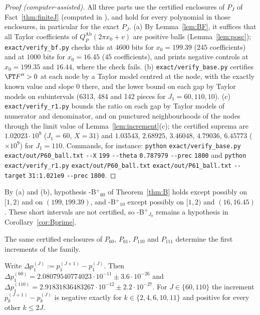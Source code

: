 \begin{proof}[Proof (computer-assisted)]
All three parts use the certified enclosures of $P_J$ of Fact~\ref{thm:finiteJ} (computed in \cite{PaperI}), and hold for
every polynomial in those enclosures, in particular for the exact $P_J$. (a) By Lemma~\ref{lem:BF}, it suffices that all
Taylor coefficients of $Q^{\mathrm{Ab}}_P(2\pi x_0+v)$ are positive balls (Lemma~\ref{lem:posc}); \nolinkurl{exact/verify_bf.py}
checks this at $4600$ bits for $x_0=199.39$ ($245$ coefficients) and at $1000$ bits for $x_0=16.45$ ($45$ coefficients),
and prints negative controls at $x_0=199.35$ and $16.44$, where the check fails. (b) \nolinkurl{exact/verify_base.py}
certifies $\FT F''>0$ at each node by a Taylor model centred at the node, with the exactly known value and slope $0$
there, and the lower bound on each gap by Taylor models on subintervals (6313, 484 and 142 pieces for $J_1=60,110,10$).
(c) \nolinkurl{exact/verify_r1.py} bounds the ratio on each gap by Taylor models of numerator and denominator, and on
punctured neighbourhoods of the nodes through the limit value of Lemma~\ref{lem:increment}(c); the certified suprema are
$1.02023\cdot10^9$ ($J_1=60$, $X=31$) and $1.03543$, $2.68925$, $3.46048$, $4.79036$, $6.45773$ ($\times10^9$) for
$J_1=110$. Commands, for instance:
\texttt{python} \nolinkurl{exact/verify_base.py} \nolinkurl{exact/out/P60_ball.txt} \nolinkurl{--X} \nolinkurl{199} \nolinkurl{--theta} \nolinkurl{0.787979} \nolinkurl{--prec} \nolinkurl{1800} and
\texttt{python} \nolinkurl{exact/verify_r1.py} \nolinkurl{exact/out/P60_ball.txt} \nolinkurl{exact/out/P61_ball.txt} \nolinkurl{--target} \nolinkurl{31:1.021e9} \nolinkurl{--prec} \nolinkurl{1800}.
\end{proof}

By (a) and (b), hypothesis \hyp{B$^+$}$_{60}$ of Theorem~\ref{thm:B} holds except possibly on $[1,2)$ and on
$(199,199.39)$, and \hyp{B$^+$}$_{10}$ except possibly on $[1,2)$ and $(16,16.45)$. These short intervals are not certified,
so \hyp{B$^+$}$_{J_0}$ remains a hypothesis in Corollary~\ref{cor:Bprime}.

The same certified enclosures of $P_{60}$, $P_{61}$, $P_{110}$ and $P_{111}$ determine the first increments of the family.

\begin{proposition}[Certified increments at $J=60$ and $J=110$]\label{prop:increments}
Write $\Delta p_1^{(J)}:=p_1^{(J+1)}-p_1^{(J)}$. Then
$\Delta p_1^{(60)}=2.08079540774023\cdot10^{-11}\pm3.6\cdot10^{-26}$ and
$\Delta p_1^{(110)}=2.91831836483267\cdot10^{-12}\pm2.2\cdot10^{-27}$. For $J\in\{60,110\}$ the increment
$p_k^{(J+1)}-p_k^{(J)}$ is negative exactly for $k\in\{2,4,6,10,11\}$ and positive for every other $k\le2J$.
\end{proposition}

